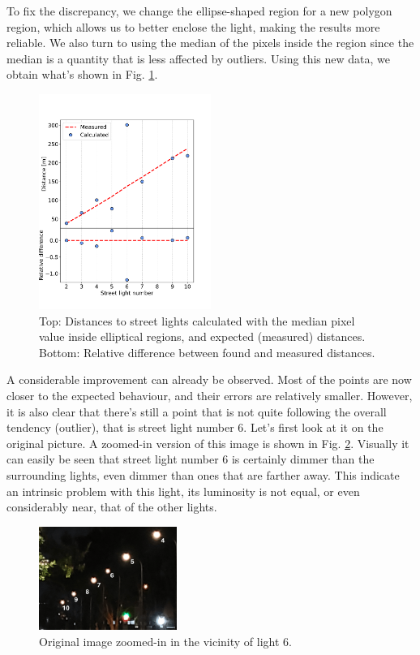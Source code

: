 \documentclass[aps,rmp,twocolumn,nofootinbib,superscriptaddress,floatfix,longbibliography]{revtex4-2}
\begin{document}
To fix the discrepancy, we change the ellipse-shaped region for a new polygon region, which allows us to better enclose the light, making the results more reliable. We also turn to using the median of the pixels inside the region since the median is a quantity that is less affected by outliers. Using this new data, we obtain what's shown in Fig. \ref{fig: Median0}.
\begin{figure}[h]
    \centering
    \includegraphics[width=0.5\textwidth]{Images/PlotMedian.pdf}
    \caption{Top: Distances to street lights calculated with the median pixel value inside elliptical regions, and expected (measured) distances. Bottom: Relative difference between found and measured distances.}
    \label{fig: Median0}
\end{figure}

A considerable improvement can already be observed. Most of the points are now closer to the expected behaviour, and their errors are relatively smaller. However, it is also clear that there's still a point that is not quite following the overall tendency (outlier), that is street light number 6. Let's first look at it on the original picture. A zoomed-in version of this image is shown in Fig. \ref{fig: zoom6}. Visually it can easily be seen that street light number 6 is certainly dimmer than the surrounding lights, even dimmer than ones that are farther away. This indicate an intrinsic problem with this light, its luminosity is not equal, or even considerably near, that of the other lights.
\begin{figure}[h]
    \centering
    \includegraphics[width=0.4\textwidth]{Images/zoom6.png}
    \caption{Original image zoomed-in in the vicinity of light 6.}
    \label{fig: zoom6}
\end{figure}
\end{document}
